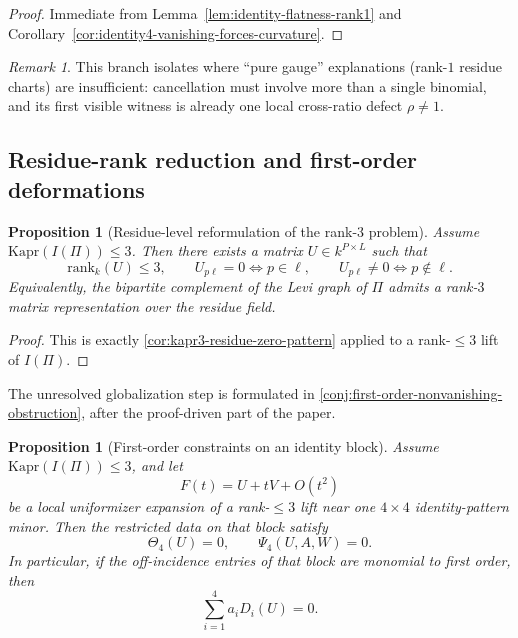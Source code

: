 \documentclass[11pt]{amsart}
\numberwithin{equation}{section}
\theoremstyle{plain}
\newtheorem{proposition}[theorem]{Proposition}
\theoremstyle{definition}
\theoremstyle{remark}
\newtheorem{remark}[theorem]{Remark}
\newcommand{\Kapr}{\mathrm{Kapr}}
\newcommand{\rank}{\mathrm{rank}}
\begin{document}
\begin{proof}
Immediate from Lemma~\ref{lem:identity-flatness-rank1} and Corollary~\ref{cor:identity4-vanishing-forces-curvature}.
\end{proof}

\begin{remark}
This branch isolates where ``pure gauge'' explanations (rank-$1$ residue charts) are insufficient:
cancellation must involve more than a single binomial, and its first visible witness is already one local cross-ratio defect $\rho\neq 1$.
\end{remark}


\subsection{Residue-rank reduction and first-order deformations}

\begin{proposition}[Residue-level reformulation of the rank-$3$ problem]
\label{prop:main-residue-minrank-reformulation}
Assume $\Kapr(I(\Pi))\le 3$.
Then there exists a matrix $U\in k^{P\times L}$ such that
\[
\rank_k(U)\le 3,
\qquad
U_{p\ell}=0 \iff p\in\ell,
\qquad
U_{p\ell}\neq 0 \iff p\notin\ell.
\]
Equivalently, the bipartite complement of the Levi graph of $\Pi$ admits a rank-$3$ matrix representation over the residue field.
\end{proposition}

\begin{proof}
This is exactly \cref{cor:kapr3-residue-zero-pattern} applied to a rank-$\le 3$ lift of $I(\Pi)$.
\end{proof}

The unresolved globalization step is formulated in \cref{conj:first-order-nonvanishing-obstruction}, after the proof-driven part of the paper.


\begin{proposition}[First-order constraints on an identity block]
\label{prop:note38-first-order-constraints}
Assume $\Kapr(I(\Pi))\le 3$, and let
\[
F(t)=U+tV+O(t^2)
\]
be a local uniformizer expansion of a rank-$\le 3$ lift near one $4\times4$ identity-pattern minor.
Then the restricted data on that block satisfy
\[
\Theta_4(U)=0,
\qquad
\Psi_4(U,A,W)=0.
\]
In particular, if the off-incidence entries of that block are monomial to first order, then
\[
\sum_{i=1}^4 a_iD_i(U)=0.
\]
\end{proposition}
\end{document}
